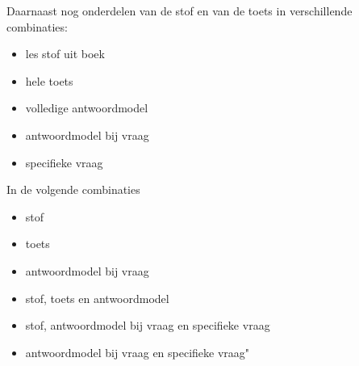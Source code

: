 \documentclass[12pt]{article}
\begin{document}
\begin{minipage}{0.45\linewidth}
    
\noindent Daarnaast nog onderdelen van de stof en van de toets in verschillende combinaties:
\begin{itemize}
    \item les stof uit boek
    \item hele toets
    \item volledige antwoordmodel
    \item antwoordmodel bij vraag
    \item specifieke vraag
\end{itemize}
\end{minipage}%
\begin{minipage}{0.45\linewidth}
In de volgende combinaties
\begin{itemize}
    \item stof
    \item toets
    \item antwoordmodel bij vraag
    \item stof, toets en antwoordmodel
    \item stof, antwoordmodel bij vraag en specifieke vraag
    \item antwoordmodel bij vraag en specifieke vraag"
\end{itemize}

\end{minipage}
\end{document}
